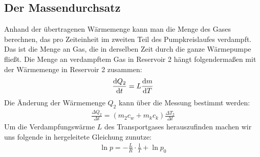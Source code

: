 \subsection{Der Massendurchsatz \cite[vgl.][]{man:v206}}
Anhand der übertragenen Wärmemenge kann man die Menge des Gases berechnen, das pro Zeiteinheit
im zweiten Teil des Pumpkreislaufes verdampft.
Das ist die Menge an Gas, die in derselben Zeit durch die ganze Wärmepumpe fließt.
Die Menge an verdampftem Gas in Reservoir 2 hängt folgendermaßen mit der Wärmemenge in Reservoir 2 zusammen:
\begin{align}
    \frac{\mathop{}\!\mathrm{d} Q_2}{\mathop{}\!\mathrm{d} t} = L \frac{\mathop{}\!\mathrm{d} m}{\mathop{}\!\mathrm{d} T}
    \label{eq:massedurchsatz}
\end{align} 
Die Änderung der Wärmemenge $ Q_2$ kann über die Messung bestimmt werden:
\begin{align}
    \frac{\Delta Q_2}{\Delta t} = (m_2 c_w + m_k c_k) \frac{\Delta T_2}{\Delta t}
\end{align} 
Um die Verdampfungswärme $L$ des Transportgases herauszufinden machen wir uns folgende in \cite[][5]{man:v203} hergeleitete
Gleichung zunutze:
\begin{align}
    \ln{p} = -\frac{L}{R}\cdot \frac{1}{T} + \ln{p_0}
    \label{eq:Dampfdruckkurve}
\end{align}
